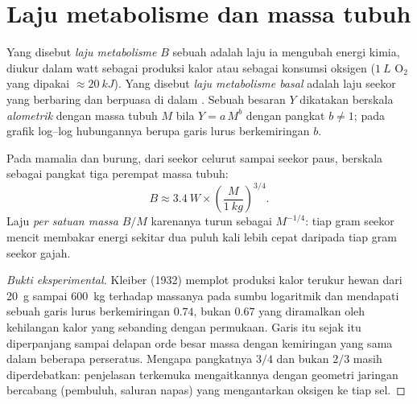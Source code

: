 \section{Laju metabolisme dan massa tubuh}

\begin{definition}\label{def:b1:organism-environment:allometry}
Yang disebut \emph{laju metabolisme} $B$ sebuah
 adalah laju ia mengubah energi kimia, diukur dalam watt
sebagai produksi kalor atau sebagai konsumsi oksigen ($\qty{1}{L}$
$\mathrm{O_2}$ yang dipakai $\approx \qty{20}{kJ}$). Yang disebut
\emph{laju metabolisme basal} adalah laju
seekor  yang berbaring dan berpuasa di dalam . Sebuah besaran $Y$ dikatakan berskala
\emph{alometrik} dengan massa tubuh $M$ bila
$Y = a\,M^{b}$ dengan pangkat $b \neq 1$; pada grafik log--log
hubungannya berupa garis lurus berkemiringan $b$.
\end{definition}

\begin{theorem}\label{thm:b1:organism-environment:kleiber}
Pada mamalia dan burung, dari seekor celurut sampai seekor paus,  berskala sebagai pangkat tiga perempat massa tubuh:
\[
B \approx \qty{3.4}{W}\times\left(\frac{M}{\qty{1}{kg}}\right)^{3/4}.
\]
Laju \emph{per satuan massa} $B/M$ karenanya turun sebagai $M^{-1/4}$:
tiap gram seekor mencit membakar energi sekitar dua puluh kali lebih
cepat daripada tiap gram seekor gajah.
\end{theorem}
\begin{proof}[Bukti eksperimental]
Kleiber (1932) memplot produksi kalor terukur hewan dari \qty{20}{g}
sampai \qty{600}{kg} terhadap massanya pada sumbu logaritmik dan
mendapati sebuah garis lurus berkemiringan $0.74$, bukan $0.67$ yang
diramalkan oleh kehilangan kalor yang sebanding dengan permukaan. Garis
itu sejak itu diperpanjang sampai delapan orde besar massa dengan
kemiringan yang sama dalam beberapa perseratus. Mengapa pangkatnya $3/4$
dan bukan $2/3$ masih diperdebatkan: penjelasan terkemuka mengaitkannya
dengan geometri jaringan bercabang (pembuluh, saluran napas) yang
mengantarkan oksigen ke tiap sel.
\end{proof}


